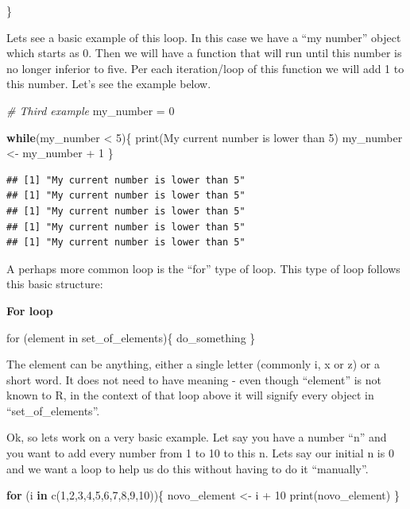 \documentclass[
]{book}
\newenvironment{Shaded}{\begin{snugshade}}{\end{snugshade}}
\newcommand{\CommentTok}[1]{\textcolor[rgb]{0.56,0.35,0.01}{\textit{#1}}}
\newcommand{\ControlFlowTok}[1]{\textcolor[rgb]{0.13,0.29,0.53}{\textbf{#1}}}
\newcommand{\DecValTok}[1]{\textcolor[rgb]{0.00,0.00,0.81}{#1}}
\newcommand{\FunctionTok}[1]{\textcolor[rgb]{0.00,0.00,0.00}{#1}}
\newcommand{\NormalTok}[1]{#1}
\newcommand{\OtherTok}[1]{\textcolor[rgb]{0.56,0.35,0.01}{#1}}
\newcommand{\SpecialCharTok}[1]{\textcolor[rgb]{0.00,0.00,0.00}{#1}}
\newcommand{\StringTok}[1]{\textcolor[rgb]{0.31,0.60,0.02}{#1}}
\begin{document}
\}

Lets see a basic example of this loop.
In this case we have a ``my number'' object which starts as 0.
Then we will have a function that will run until this number is no longer inferior to five.
Per each iteration/loop of this function we will add 1 to this number.
Let's see the example below.

\begin{Shaded}
\begin{Highlighting}[]
\CommentTok{\# Third example}
\NormalTok{my\_number }\OtherTok{=} \DecValTok{0}

\ControlFlowTok{while}\NormalTok{(my\_number }\SpecialCharTok{\textless{}} \DecValTok{5}\NormalTok{)\{}
  \FunctionTok{print}\NormalTok{(}\StringTok{\textquotesingle{}My current number is lower than 5\textquotesingle{}}\NormalTok{)}
\NormalTok{  my\_number }\OtherTok{\textless{}{-}}\NormalTok{ my\_number }\SpecialCharTok{+} \DecValTok{1}
\NormalTok{\}}
\end{Highlighting}
\end{Shaded}

\begin{verbatim}
## [1] "My current number is lower than 5"
## [1] "My current number is lower than 5"
## [1] "My current number is lower than 5"
## [1] "My current number is lower than 5"
## [1] "My current number is lower than 5"
\end{verbatim}

A perhaps more common loop is the ``for'' type of loop.
This type of loop follows this basic structure:

\textbf{For loop}

for (element in set\_of\_elements)\{ do\_something \}

The element can be anything, either a single letter (commonly i, x or z) or a short word.
It does not need to have meaning - even though ``element'' is not known to R, in the context of that loop above it will signify every object in ``set\_of\_elements''.

Ok, so lets work on a very basic example.
Let say you have a number ``n'' and you want to add every number from 1 to 10 to this n.
Lets say our initial n is 0 and we want a loop to help us do this without having to do it ``manually''.

\begin{Shaded}
\begin{Highlighting}[]
\ControlFlowTok{for}\NormalTok{ (i }\ControlFlowTok{in} \FunctionTok{c}\NormalTok{(}\DecValTok{1}\NormalTok{,}\DecValTok{2}\NormalTok{,}\DecValTok{3}\NormalTok{,}\DecValTok{4}\NormalTok{,}\DecValTok{5}\NormalTok{,}\DecValTok{6}\NormalTok{,}\DecValTok{7}\NormalTok{,}\DecValTok{8}\NormalTok{,}\DecValTok{9}\NormalTok{,}\DecValTok{10}\NormalTok{))\{}
\NormalTok{  novo\_element }\OtherTok{\textless{}{-}}\NormalTok{ i }\SpecialCharTok{+} \DecValTok{10}
  \FunctionTok{print}\NormalTok{(novo\_element)}
\NormalTok{\}}
\end{Highlighting}
\end{Shaded}
\end{document}

